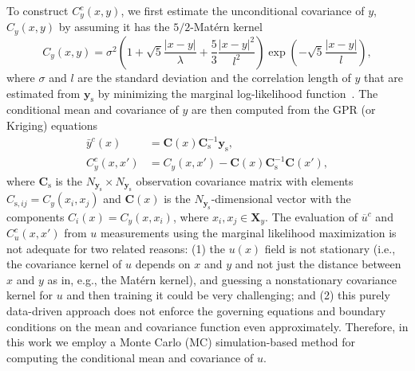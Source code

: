 \documentclass{agujournal2019}
\begin{document}
To construct $C^c_y(x,y)$, we first estimate the unconditional covariance of $y$, $C_y(x,y)$ by assuming it has the $5/2$-Mat\'{e}rn kernel
%
\begin{equation*}
  C_y(x,y) = \sigma^2 \left(1 + \sqrt{5}\frac{|x-y|}{\lambda} + \frac{5}{3}\frac{|x-y|^2}{l^2}\right) \exp\left(- \sqrt{5} \frac{|x-y|}{l}\right),
\end{equation*}
%
where $\sigma$ and $l$ are the standard deviation and the correlation length of $y$ that are estimated from $\mathbf{y}_{\mathrm{s}}$ by minimizing the marginal log-likelihood function~\citep{rasmussen2003gaussian}.
The conditional mean and covariance of $y$ are then computed from the GPR (or Kriging) equations
%
\begin{align}
  \label{eq:gpr-mean}
  \bar{y}^c(x) &=  \mathbf{C}(x) \mathbf{C}^{-1}_{\mathrm{s}}  \mathbf{y}_{\mathrm{s}},\\
  \label{eq:gpr-var}
  C^c_y(x, x') &= C_y(x, x') - \mathbf{C}(x) \mathbf{C}^{-1}_{\mathrm{s}} \mathbf{C}(x'),
\end{align}
%
where $\mathbf{C}_{\mathrm{s}}$ is the $N_{\mathbf{y}_{\mathrm{s}}} \times N_{\mathbf{y}_{\mathrm{s}}}$ observation covariance matrix with elements $C_{\mathrm{s},ij} = C_y(x_i,x_j)$ and $\mathbf{C}(x)$ is the  $N_{\mathbf{y}_{\mathrm{s}}}$-dimensional vector with the components  $C_i(x)= C_y(x,x_i)$, where $x_i, x_j \in\mathbf{X}_y$.  
The evaluation of $\overline{u}^c$ and $C_u^c(x,x')$ from $u$ measurements using the marginal likelihood maximization is not adequate for two related reasons: (1) the $u(x)$ field is not stationary (i.e., the covariance kernel of $u$ depends on $x$ and $y$ and not just the distance between $x$ and $y$ as in, e.g., the Mat\'{e}rn kernel), and guessing a nonstationary covariance kernel for $u$ and then training it could be very challenging; and (2) this purely data-driven approach does not enforce the governing equations and boundary conditions on the mean and covariance function even approximately. 
Therefore, in this work we employ a Monte Carlo (MC) simulation-based method for computing the conditional mean and covariance of $u$.
\end{document}
